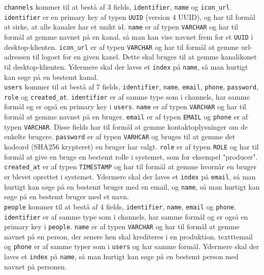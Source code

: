 \noindent
\texttt{channels} kommer til at bestå af 3 fields, \texttt{identifier}, \texttt{name} og \texttt{icon\_url}. \texttt{identifier} er en primary key af typen \texttt{UUID} (version 4 UUID), og har til formål at sirke, at alle kanaler har et unikt id. \texttt{name} er af typen \texttt{VARCHAR} og har til formål at gemme navnet på en kanal, så man kan vise navnet frem for et \texttt{UUID} i desktop-klienten. \texttt{icon\_url} er af typen \texttt{VARCHAR} og har til formål at gemme url-adressen til logoet for en given kanel. Dette skal bruges til at gemme kanalikonet til desktop-klienten. Ydermere skal der laves et \texttt{index} på \texttt{name}, så man hurtigt kan søge på en bestemt kanal.\\

\noindent
\texttt{users} kommer til at bestå af 7 fields, \texttt{identifier}, \texttt{name}, \texttt{email}, \texttt{phone}, \texttt{password}, \texttt{role} og \texttt{created\_at}. \texttt{identifier} er af samme type som i channels, har samme formål og er også en primary key i \texttt{users}. \texttt{name} er af typen \texttt{VARCHAR} og har til formål at gemme navnet på en bruger. \texttt{email} er af typen \texttt{EMAIL} og \texttt{phone} er af typen \texttt{VARCHAR}. Disse fields har til formål at gemme kontaktoplysninger om de enkelte brugere. \texttt{password} er af typen \texttt{VARHCAR} og bruges til at gemme det kodeord (SHA256 krypteret) en bruger har valgt. \texttt{role} er af typen \texttt{ROLE} og har til formål at give en bruge en bestemt rolle i systemet, som for eksempel "producer". \texttt{created\_at} er af typen \texttt{TIMESTAMP} og har til formål at gemme hvornår en bruger er blevet oprettet i systemet. Ydermere skal der laves et \texttt{index} på \texttt{email}, så man hurtigt kan søge på en bestemt bruger med en email, og \texttt{name}, så man hurtigt kan søge på en bestemt bruger med et navn.\\

\noindent
\texttt{people} kommer til at bestå af 4 fields, \texttt{identifier}, \texttt{name}, \texttt{email} og \texttt{phone}. \texttt{identifier} er af samme type som i channels, har samme formål og er også en primary key i \texttt{people}. \texttt{name} er af typen \texttt{VARCHAR} og har til formål at gemme navnet på en person, der senere hen skal krediteres i en produktion. texttt{email} og \texttt{phone} er af samme typer som i \texttt{users} og har samme formål. Ydermere skal der laves et \texttt{index} på \texttt{name}, så man hurtigt kan søge på en bestemt person med navnet på personen.\\

